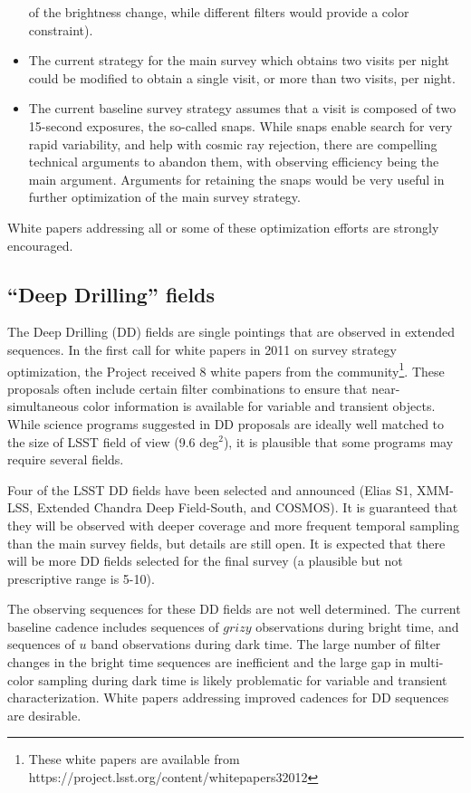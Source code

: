 \documentclass[DM,lsstdraft,toc,usenatbib]{lsstdoc}
\begin{document}
\begin{itemize}
of the brightness change, while different filters would provide a color constraint). 
\item The current strategy for the main survey which obtains two visits per night could be 
modified to obtain a single visit, or more than two visits, per night. 
\item The current baseline survey strategy assumes that a visit is composed of two 15-second
exposures, the so-called snaps. While snaps enable search for very rapid variability,
and help with cosmic ray rejection, there are compelling technical arguments to abandon
them, with observing efficiency being the main argument. Arguments for retaining the
snaps would be very useful in further optimization of the main survey strategy. 
\end{itemize}
White papers addressing all or some of these optimization efforts are strongly encouraged.


\subsection{``Deep Drilling'' fields} 

The Deep Drilling (DD) fields are single pointings that are observed in extended sequences. 
In the first call for white papers in 2011 on survey strategy optimization, the Project received 
8 white papers from the community\footnote{These white papers are available from 
https://project.lsst.org/content/whitepapers32012}. These proposals often include certain 
filter combinations to ensure that near-simultaneous color information is available for 
variable and transient objects. While science programs suggested in DD proposals are ideally well 
matched to the size of LSST field of view (9.6 deg$^2$), it is plausible that some
programs may require several fields. 

Four of the LSST DD fields have been selected and announced (Elias S1, 
XMM-LSS, Extended Chandra Deep Field-South, and COSMOS). It is guaranteed that they 
will be observed with deeper coverage and more frequent temporal sampling than the main 
survey fields, but details are still open. It is expected that there will be more DD fields 
selected for the final survey (a plausible but not prescriptive range is 5-10). 

The observing sequences for these DD fields are not well determined. The current baseline
cadence includes sequences of $grizy$ observations during bright time, and sequences of $u$ 
band observations during dark time. The large number of filter changes in the bright time sequences
are inefficient and the large gap in multi-color sampling during dark time is likely problematic 
for variable and transient characterization. White papers addressing improved cadences for DD 
sequences are desirable.
\end{document}
